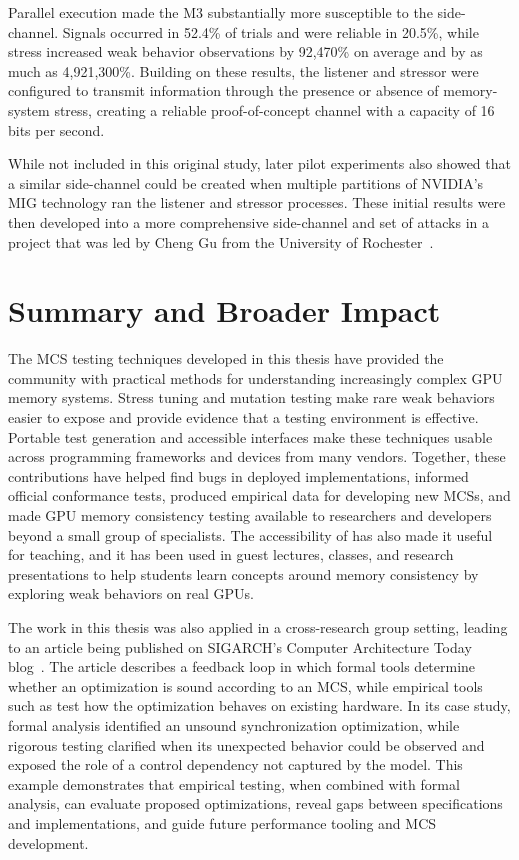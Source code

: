 Parallel execution made the M3 substantially more susceptible to the side-channel. Signals occurred in 52.4\% of trials and were reliable in 20.5\%, while stress increased weak behavior observations by 92,470\% on average and by as much as 4,921,300\%. Building on these results, the listener and stressor were configured to transmit information through the presence or absence of memory-system stress, creating a reliable proof-of-concept channel with a capacity of 16 bits per second.

While not included in this original study, later pilot experiments also showed that a similar side-channel could be created when multiple partitions of NVIDIA's MIG technology ran the listener and stressor processes. These initial results were then developed into a more comprehensive side-channel and set of attacks in a project that was led by Cheng Gu from the University of Rochester~\cite{gu2026behindbars}.

\section{Summary and Broader Impact \label{sec:gpuharbor-broader-impact}}

The MCS testing techniques developed in this thesis have provided the community with practical methods for understanding increasingly complex GPU memory systems. Stress tuning and mutation testing make rare weak behaviors easier to expose and provide evidence that a testing environment is effective. Portable test generation and accessible interfaces make these techniques usable across programming frameworks and devices from many vendors. Together, these contributions have helped find bugs in deployed implementations, informed official conformance tests, produced empirical data for developing new MCSs, and made GPU memory consistency testing available to researchers and developers beyond a small group of specialists. The accessibility of \gpuharbor has also made it useful for teaching, and it has been used in guest lectures, classes, and research presentations to help students learn concepts around memory consistency by exploring weak behaviors on real GPUs.

The work in this thesis was also applied in a cross-research group setting, leading to an article being published on SIGARCH's Computer Architecture Today blog~\cite{basu2025gpu-mcs-blog}. The article describes a feedback loop in which formal tools determine whether an optimization is sound according to an MCS, while empirical tools such as \gpuharbor test how the optimization behaves on existing hardware. In its case study, formal analysis identified an unsound synchronization optimization, while rigorous testing clarified when its unexpected behavior could be observed and exposed the role of a control dependency not captured by the model. This example demonstrates that empirical testing, when combined with formal analysis, can evaluate proposed optimizations, reveal gaps between specifications and implementations, and guide future performance tooling and MCS development.
